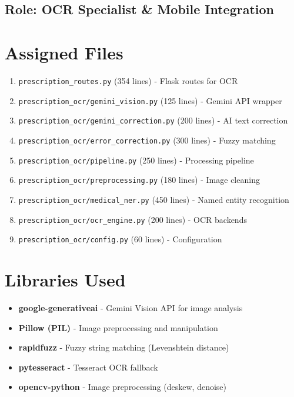 \documentclass[12pt,a4paper]{report}
\begin{document}
\subsection*{Role: OCR Specialist \& Mobile Integration}

\section{Assigned Files}
\begin{enumerate}
    \item \texttt{prescription\_routes.py} (354 lines) - Flask routes for OCR
    \item \texttt{prescription\_ocr/gemini\_vision.py} (125 lines) - Gemini API wrapper
    \item \texttt{prescription\_ocr/gemini\_correction.py} (200 lines) - AI text correction
    \item \texttt{prescription\_ocr/error\_correction.py} (300 lines) - Fuzzy matching
    \item \texttt{prescription\_ocr/pipeline.py} (250 lines) - Processing pipeline
    \item \texttt{prescription\_ocr/preprocessing.py} (180 lines) - Image cleaning
    \item \texttt{prescription\_ocr/medical\_ner.py} (450 lines) - Named entity recognition
    \item \texttt{prescription\_ocr/ocr\_engine.py} (200 lines) - OCR backends
    \item \texttt{prescription\_ocr/config.py} (60 lines) - Configuration
\end{enumerate}

\section{Libraries Used}
\begin{itemize}
    \item \textbf{google-generativeai} - Gemini Vision API for image analysis
    \item \textbf{Pillow (PIL)} - Image preprocessing and manipulation
    \item \textbf{rapidfuzz} - Fuzzy string matching (Levenshtein distance)
    \item \textbf{pytesseract} - Tesseract OCR fallback
    \item \textbf{opencv-python} - Image preprocessing (deskew, denoise)
\end{itemize}
\end{document}
